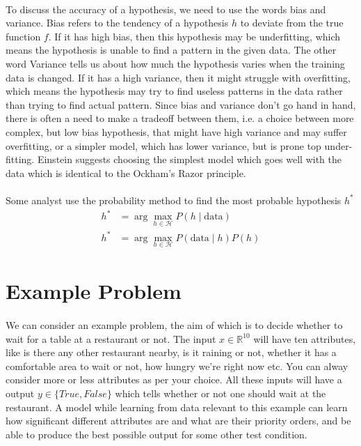 \documentclass{article}
\begin{document}
    \paragraph{}
    To discuss the accuracy of a hypothesis, we need to use the words bias and variance. 
    Bias refers to the tendency of a hypothesis $h$ to deviate from the true function $f$.
    If it has high bias, then this hypothesis may be underfitting, which means the hypothesis is unable to find a pattern in the given data. 
    The other word Variance tells us about how much the hypothesis varies when the training data is changed. 
    If it has a high variance, then it might struggle with overfitting, which means the hypothesis may try to find useless patterns in the data rather than trying to find actual pattern. 
    Since bias and variance don't go hand in hand, there is often a need to make a tradeoff between them, i.e. a choice between more complex, but low bias hypothesis, that might have high variance and may suffer overfitting, or a simpler model, which has lower variance, but is prone top under-fitting. 
    Einstein suggests choosing the simplest model which goes well with the data which is identical to the Ockham’s Razor principle.

  \paragraph{}
    Some analyst use the probability method to find the most probable hypothesis $h^*$
    \begin{align*}
      \displaystyle h^* &= \arg \max_{h \in \mathcal{H}} P(h \mid \text{data}) \\ 
      \displaystyle h^* &= \arg \max_{h \in \mathcal{H}} P(\text{data} \mid h) P(h)
    \end{align*}
    

\section*{Example Problem}
  \paragraph{}
  We can consider an example problem, the aim of which is to decide whether to wait for a table at a restaurant or not. 
  The input  $x \in \mathbb{R} ^ {10} $ will have ten attributes, like is there any other restaurant nearby, is it raining or not, whether it has a comfortable area to wait or not, how hungry we’re right now etc.
  You can alway consider more or less attributes as per your choice.
  All these inputs will have a output $\displaystyle y \in \{True, False\}$ which tells whether or not one should wait at the restaurant.
  A model while learning from data relevant to this example can learn how significant different attributes are and what are their priority orders, and be able to produce the best possible output for some other test condition.
\end{document}
